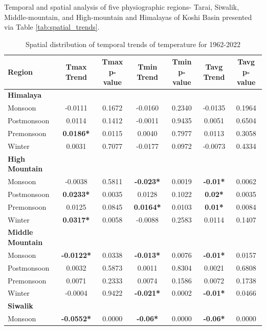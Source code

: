 
Temporal and spatial analysis of five physiographic regions- Tarai, Siwalik, Middle-mountain, and High-mountain and Himalayas of Koshi Basin presented via Table \ref{tab:spatial_trends}.

\begin{table}[htbp]
  \centering
  \caption{Spatial distribution of temporal trends of temperature for 1962-2022}
  \begin{tabular}{@{}lcccccc@{}}
      \toprule
      Region & Tmax Trend & Tmax p-value & Tmin Trend & Tmin p-value & Tavg Trend & Tavg p-value \\ 
      \midrule
      \textbf{Himalaya} & & & & & & \\ 
      Monsoon & -0.0111 & 0.1672 & -0.0160 & 0.2340 & -0.0135 & 0.1964 \\ 
      Postmonsoon & 0.0114 & 0.1412 & -0.0011 & 0.9435 & 0.0051 & 0.6504 \\ 
      Premonsoon & \textbf{0.0186*} & 0.0115 & 0.0040 & 0.7977 & 0.0113 & 0.3058 \\ 
      Winter & 0.0031 & 0.7077 & -0.0177 & 0.0972 & -0.0073 & 0.4334 \\ 
      \midrule
      \textbf{High Mountain} & & & & & & \\ 
      Monsoon & -0.0038 & 0.5811 & \textbf{-0.023*} & 0.0019 & \textbf{-0.01*} & 0.0062 \\ 
      Postmonsoon & \textbf{0.0233*} & 0.0035 & 0.0128 & 0.1022 & \textbf{0.02*} & 0.0035 \\ 
      Premonsoon & 0.0125 & 0.0845 & \textbf{0.0164*} & 0.0103 & \textbf{0.01*} & 0.0084 \\ 
      Winter & \textbf{0.0317*} & 0.0058 & -0.0088 & 0.2583 & 0.0114 & 0.1407 \\ 
      \midrule
      \textbf{Middle Mountain} & & & & & & \\ 
      Monsoon & \textbf{-0.0122*} & 0.0338 & \textbf{-0.013*} & 0.0076 & \textbf{-0.01*} & 0.0157 \\ 
      Postmonsoon & 0.0032 & 0.5873 & 0.0011 & 0.8304 & 0.0021 & 0.6808 \\ 
      Premonsoon & 0.0071 & 0.2333 & 0.0074 & 0.1586 & 0.0072 & 0.1738 \\ 
      Winter & -0.0004 & 0.9422 & \textbf{-0.021*} & 0.0002 & \textbf{-0.01*} & 0.0466 \\ 
      \midrule
      \textbf{Siwalik} & & & & & & \\ 
      Monsoon & \textbf{-0.0552*} & 0.0000 & \textbf{-0.06*} & 0.0000 & \textbf{-0.06*} & 0.0000 \\ 

\end{tabular}
\end{table}
